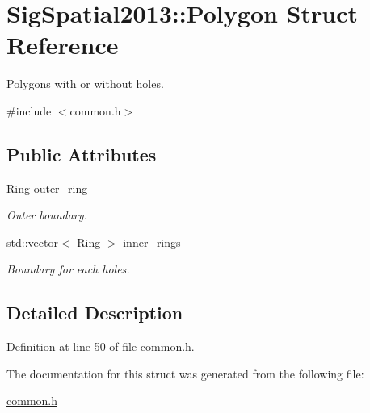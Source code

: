 \hypertarget{structSigSpatial2013_1_1Polygon}{\section{Sig\-Spatial2013\-:\-:Polygon Struct Reference}
\label{structSigSpatial2013_1_1Polygon}
}


Polygons with or without holes.  




{\ttfamily \#include $<$common.\-h$>$}

\subsection*{Public Attributes}
\begin{DoxyCompactItemize}
\item 
\hypertarget{structSigSpatial2013_1_1Polygon_a3a998563c748b268a2148d87f6917378}{\hyperlink{structSigSpatial2013_1_1Ring}{Ring} \hyperlink{structSigSpatial2013_1_1Polygon_a3a998563c748b268a2148d87f6917378}{outer\-\_\-ring}}\label{structSigSpatial2013_1_1Polygon_a3a998563c748b268a2148d87f6917378}

\begin{DoxyCompactList}\small\item\em Outer boundary. \end{DoxyCompactList}\item 
\hypertarget{structSigSpatial2013_1_1Polygon_ac78207a99824ccf5571134a51658de9a}{std\-::vector$<$ \hyperlink{structSigSpatial2013_1_1Ring}{Ring} $>$ \hyperlink{structSigSpatial2013_1_1Polygon_ac78207a99824ccf5571134a51658de9a}{inner\-\_\-rings}}\label{structSigSpatial2013_1_1Polygon_ac78207a99824ccf5571134a51658de9a}

\begin{DoxyCompactList}\small\item\em Boundary for each holes. \end{DoxyCompactList}\end{DoxyCompactItemize}


\subsection{Detailed Description}


Definition at line 50 of file common.\-h.



The documentation for this struct was generated from the following file\-:\begin{DoxyCompactItemize}
\item 
\hyperlink{common_8h}{common.\-h}\end{DoxyCompactItemize}
